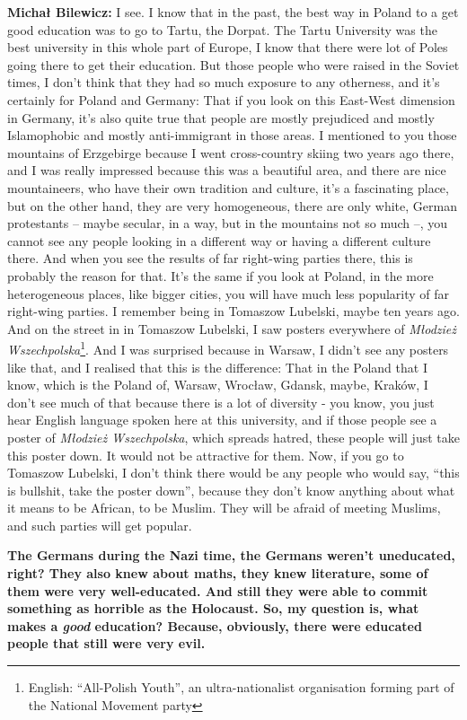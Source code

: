 \textbf{Michał Bilewicz:} I see. I know that in the past, the best way in Poland to a get good education was to go to Tartu, the Dorpat. The Tartu University was the best university in this whole part of Europe, I know that there were lot of Poles going there to get their education. But those people who were raised in the Soviet times, I don’t think that they had so much exposure to any otherness, and it's certainly for Poland and Germany: That if you look on this East-West dimension in Germany, it’s also quite true that people are mostly prejudiced and mostly Islamophobic and mostly anti-immigrant in those areas. I mentioned to you those mountains of Erzgebirge because I went cross-country skiing two years ago there, and I was really impressed because this was a beautiful area, and there are nice mountaineers, who have their own tradition and culture, it’s a fascinating place, but on the other hand, they are very homogeneous, there are only white, German protestants – maybe secular, in a way, but in the mountains not so much –, you cannot see any people looking in a different way or having a different culture there. And when you see the results of far right-wing parties there, this is probably the reason for that. It's the same if you look at Poland, in the more heterogeneous  places, like bigger cities, you will have much less popularity of far right-wing parties. I remember being in Tomaszow Lubelski, maybe ten years ago. And on the street in in Tomaszow Lubelski, I saw posters everywhere of \textit{Młodzież Wszechpolska}\footnote{English: ``All-Polish Youth'', an ultra-nationalist organisation forming part of the National Movement party}. And I was surprised because in Warsaw, I didn’t see any posters like that, and I realised that this is the difference: That in the Poland that I know, which is the Poland of, Warsaw, Wrocław, Gdansk, maybe, Kraków, I don’t see much of that because there is a lot of diversity - you know, you just hear English language spoken here at this university, and if those people see a poster of \textit{Młodzież Wszechpolska}, which spreads hatred, these people will just take this poster down. It would not be attractive for them. Now, if you go to Tomaszow Lubelski, I don’t think there would be any people who would say, ``this is bullshit, take the poster down'', because they don’t know anything about what it means to be African, to be Muslim. They will be afraid of meeting Muslims, and such parties will get popular.

\textbf{The Germans during the Nazi time, the Germans weren’t uneducated, right? They also knew about maths, they knew literature, some of them were very well-educated. And still they were able to commit something as horrible as the Holocaust. So, my question is, what makes a \textit{good} education? Because, obviously, there were educated people that still were very evil.}

